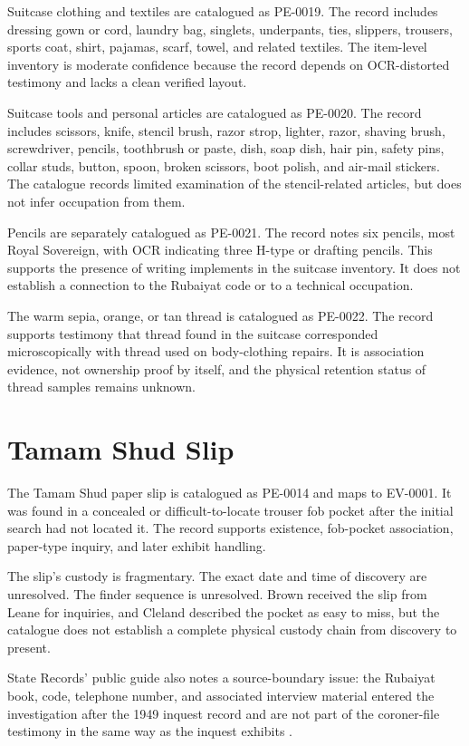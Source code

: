 Suitcase clothing and textiles are catalogued as PE-0019. The record includes dressing gown or cord, laundry bag, singlets, underpants, ties, slippers, trousers, sports coat, shirt, pajamas, scarf, towel, and related textiles. The item-level inventory is moderate confidence because the record depends on OCR-distorted testimony and lacks a clean verified layout.

Suitcase tools and personal articles are catalogued as PE-0020. The record includes scissors, knife, stencil brush, razor strop, lighter, razor, shaving brush, screwdriver, pencils, toothbrush or paste, dish, soap dish, hair pin, safety pins, collar studs, button, spoon, broken scissors, boot polish, and air-mail stickers. The catalogue records limited examination of the stencil-related articles, but does not infer occupation from them.

Pencils are separately catalogued as PE-0021. The record notes six pencils, most Royal Sovereign, with OCR indicating three H-type or drafting pencils. This supports the presence of writing implements in the suitcase inventory. It does not establish a connection to the Rubaiyat code or to a technical occupation.

The warm sepia, orange, or tan thread is catalogued as PE-0022. The record supports testimony that thread found in the suitcase corresponded microscopically with thread used on body-clothing repairs. It is association evidence, not ownership proof by itself, and the physical retention status of thread samples remains unknown.

\section{Tamam Shud Slip}

The Tamam Shud paper slip is catalogued as PE-0014 and maps to EV-0001. It was found in a concealed or difficult-to-locate trouser fob pocket after the initial search had not located it. The record supports existence, fob-pocket association, paper-type inquiry, and later exhibit handling.

The slip's custody is fragmentary. The exact date and time of discovery are unresolved. The finder sequence is unresolved. Brown received the slip from Leane for inquiries, and Cleland described the pocket as easy to miss, but the catalogue does not establish a complete physical custody chain from discovery to present.

State Records' public guide also notes a source-boundary issue: the Rubaiyat book, code, telephone number, and associated interview material entered the investigation after the 1949 inquest record and are not part of the coroner-file testimony in the same way as the inquest exhibits \parencite{src-src-0003}.

